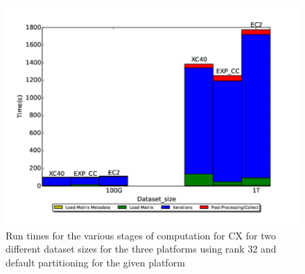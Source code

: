         \begin{figure} [H]
    \begin{centering}
    \includegraphics[scale=0.4]{images/CX_Size_Scaling_Rank_32_Partitions_default.pdf}
    \end{centering}
    \caption{ Run times for the various stages of computation for CX for two different dataset sizes for the three platforms using rank 32 and default partitioning for the given platform}
    \label{fig:h2hrank32} 
    \end{figure}
    
